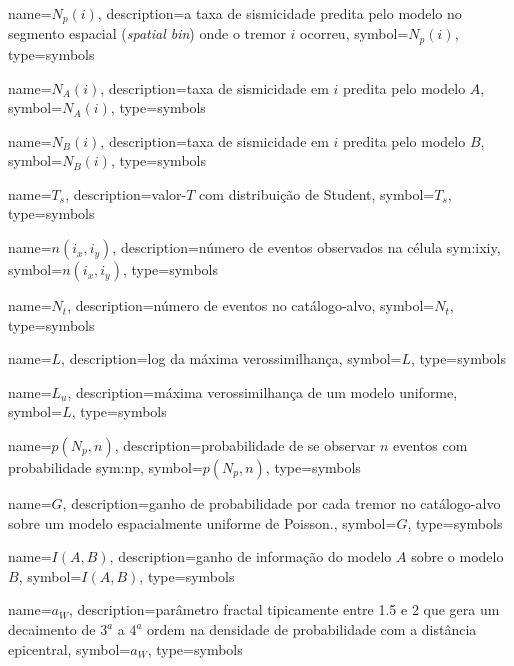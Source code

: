{
	name={\ensuremath{N_p(i)}},
	description={a taxa de sismicidade predita pelo modelo no segmento espacial (\emph{spatial bin}) onde o tremor $i$
	ocorreu}, symbol={\ensuremath{N_p(i)}},
	type=symbols
}


{
	name={\ensuremath{N_A(i)}},
	description={taxa de sismicidade em $i$ predita pelo modelo $A$}, 
	symbol={\ensuremath{N_A(i)}},
	type=symbols
}


{
	name={\ensuremath{N_B(i)}},
	description={taxa de sismicidade em $i$ predita pelo modelo $B$},
	symbol={\ensuremath{N_B(i)}},
	type=symbols
}


{
	name={\ensuremath{T_s}},
	description={valor-$T$ com distribuição de Student},
	symbol={\ensuremath{T_s}},
	type=symbols
}

{
	name={\ensuremath{n\left(i_x, i_y\right)}},
	description={número de eventos observados na célula \gls{sym:ixiy}},
	symbol={\ensuremath{n\left(i_x, i_y\right)}},
	type=symbols
}


{
	name={\ensuremath{N_t}},
	description={número de eventos no catálogo-alvo},
	symbol={\ensuremath{N_t}},
	type=symbols
}



{
	name={\ensuremath{L}},
	description={log da máxima verossimilhança},
	symbol={\ensuremath{L}},
	type=symbols
}


{
	name={\ensuremath{L_u}},
	description={máxima verossimilhança de um modelo uniforme},
	symbol={\ensuremath{L}},
	type=symbols
}


{
	name={\ensuremath{p(N_p, n)}},
	description={probabilidade de se observar $n$ eventos com probabilidade \gls{sym:np}},
	symbol={\ensuremath{p(N_p, n)}},
	type=symbols
}


{
	name={\ensuremath{G}},
	description={ganho de probabilidade por cada tremor no catálogo-alvo
				 sobre um modelo espacialmente uniforme de Poisson.}, 
	symbol={\ensuremath{G}}, 
	type=symbols
}


{
	name={\ensuremath{ I(A,B)}},
	description={ganho de informação do modelo $A$ sobre o modelo $B$}, 
	symbol={\ensuremath{I(A,B)}}, 
	type=symbols
}


{
	name={\ensuremath{a_W}},
	description={parâmetro fractal tipicamente entre 1.5 e 2 
				 que gera um decaimento de $3^{a}$ a $4^{a}$ ordem 
				 na densidade de probabilidade com a distância epicentral}, 
	symbol={\ensuremath{a_W}}, 
	type=symbols
}




